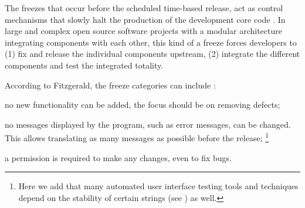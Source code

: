 \documentclass[dvipsnames]{bmcart}
\theoremstyle{definition}
\begin{document}
The freezes that occur before the scheduled time-based release, act as control mechanisms that slowly halt the production of the development core code \cite{fitzgerald2011open,Anand2017}. In large and complex open source software projects with a modular architecture integrating components with each other, this kind of a freeze forces developers to (1) fix and release the individual components upstream, (2) integrate the different components and test the integrated totality.  

According to Fitzgerald, the freeze categories can include \cite{fitzgerald2011open}: 
\begin{description}[leftmargin=!,labelwidth=\widthof{\bfseries feature freeze}]
\footnotesize
 \item[feature freeze] no new functionality can be added, the focus should be on removing defects;
\item[string freeze] no messages displayed by the program, such as error messages,  can be changed. This allows translating as many messages as possible before the release; \footnote{Here we add that many automated user interface testing tools and techniques depend on the stability of certain strings (see \cite{mesbah2009invariant,artzi2011framework}) as well.}
\item[code freeze] a permission  is required to make any changes, even to fix bugs.
\end{description}




% 
% 
% 
% 


 
% 
% 
\end{document}
